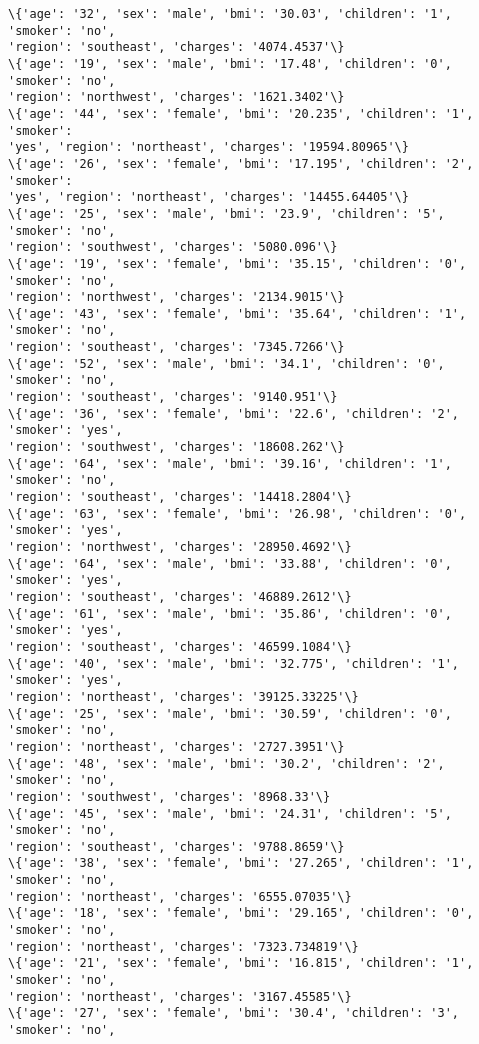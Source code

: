 \documentclass[11pt]{article}
\begin{document}
\begin{Verbatim}[commandchars=\\\{\}]
\{'age': '32', 'sex': 'male', 'bmi': '30.03', 'children': '1', 'smoker': 'no',
'region': 'southeast', 'charges': '4074.4537'\}
\{'age': '19', 'sex': 'male', 'bmi': '17.48', 'children': '0', 'smoker': 'no',
'region': 'northwest', 'charges': '1621.3402'\}
\{'age': '44', 'sex': 'female', 'bmi': '20.235', 'children': '1', 'smoker':
'yes', 'region': 'northeast', 'charges': '19594.80965'\}
\{'age': '26', 'sex': 'female', 'bmi': '17.195', 'children': '2', 'smoker':
'yes', 'region': 'northeast', 'charges': '14455.64405'\}
\{'age': '25', 'sex': 'male', 'bmi': '23.9', 'children': '5', 'smoker': 'no',
'region': 'southwest', 'charges': '5080.096'\}
\{'age': '19', 'sex': 'female', 'bmi': '35.15', 'children': '0', 'smoker': 'no',
'region': 'northwest', 'charges': '2134.9015'\}
\{'age': '43', 'sex': 'female', 'bmi': '35.64', 'children': '1', 'smoker': 'no',
'region': 'southeast', 'charges': '7345.7266'\}
\{'age': '52', 'sex': 'male', 'bmi': '34.1', 'children': '0', 'smoker': 'no',
'region': 'southeast', 'charges': '9140.951'\}
\{'age': '36', 'sex': 'female', 'bmi': '22.6', 'children': '2', 'smoker': 'yes',
'region': 'southwest', 'charges': '18608.262'\}
\{'age': '64', 'sex': 'male', 'bmi': '39.16', 'children': '1', 'smoker': 'no',
'region': 'southeast', 'charges': '14418.2804'\}
\{'age': '63', 'sex': 'female', 'bmi': '26.98', 'children': '0', 'smoker': 'yes',
'region': 'northwest', 'charges': '28950.4692'\}
\{'age': '64', 'sex': 'male', 'bmi': '33.88', 'children': '0', 'smoker': 'yes',
'region': 'southeast', 'charges': '46889.2612'\}
\{'age': '61', 'sex': 'male', 'bmi': '35.86', 'children': '0', 'smoker': 'yes',
'region': 'southeast', 'charges': '46599.1084'\}
\{'age': '40', 'sex': 'male', 'bmi': '32.775', 'children': '1', 'smoker': 'yes',
'region': 'northeast', 'charges': '39125.33225'\}
\{'age': '25', 'sex': 'male', 'bmi': '30.59', 'children': '0', 'smoker': 'no',
'region': 'northeast', 'charges': '2727.3951'\}
\{'age': '48', 'sex': 'male', 'bmi': '30.2', 'children': '2', 'smoker': 'no',
'region': 'southwest', 'charges': '8968.33'\}
\{'age': '45', 'sex': 'male', 'bmi': '24.31', 'children': '5', 'smoker': 'no',
'region': 'southeast', 'charges': '9788.8659'\}
\{'age': '38', 'sex': 'female', 'bmi': '27.265', 'children': '1', 'smoker': 'no',
'region': 'northeast', 'charges': '6555.07035'\}
\{'age': '18', 'sex': 'female', 'bmi': '29.165', 'children': '0', 'smoker': 'no',
'region': 'northeast', 'charges': '7323.734819'\}
\{'age': '21', 'sex': 'female', 'bmi': '16.815', 'children': '1', 'smoker': 'no',
'region': 'northeast', 'charges': '3167.45585'\}
\{'age': '27', 'sex': 'female', 'bmi': '30.4', 'children': '3', 'smoker': 'no',

\end{Verbatim}
\end{document}
